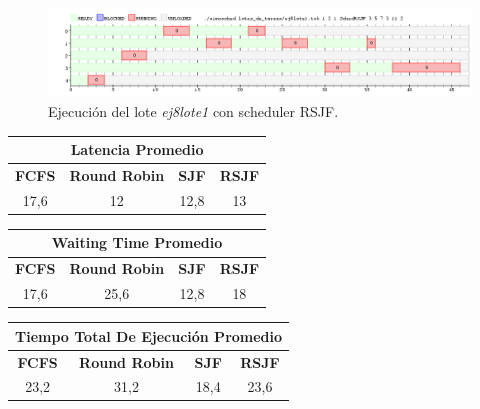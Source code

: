 \begin{figure}[!h]
	\begin{center}
		\includegraphics[width=500px]{imagenes/ej8_prueba1_rsjf.png}
		\caption{Ejecución del lote \emph{ej8lote1} con scheduler RSJF.}
		\label{fig:grafico_ej8_prueba1_rsjf}
	\end{center}
\end{figure}

\begin{center}
	\begin{tabular}{|c|c|c|c|}
		\hline
		\multicolumn{4}{|c|}{\large{\textbf{Latencia Promedio}}} \\
		\hline
		\textbf{FCFS} & \textbf{Round Robin} & \textbf{SJF} & \textbf{RSJF} \\
		\hline
		17,6 & 12 & 12,8 & 13 \\
		\hline
	\end{tabular}
\end{center}

\begin{center}
	\begin{tabular}{|c|c|c|c|}
		\hline
		\multicolumn{4}{|c|}{\large{\textbf{Waiting Time Promedio}}} \\
		\hline
		\textbf{FCFS} & \textbf{Round Robin} & \textbf{SJF} & \textbf{RSJF} \\
		\hline
		17,6 & 25,6 & 12,8 & 18 \\
		\hline
	\end{tabular}
\end{center}

\begin{center}
	\begin{tabular}{|c|c|c|c|}
		\hline
		\multicolumn{4}{|c|}{\large{\textbf{Tiempo Total De Ejecución Promedio}}} \\
		\hline
		\textbf{FCFS} & \textbf{Round Robin} & \textbf{SJF} & \textbf{RSJF} \\
		\hline
		23,2 & 31,2 & 18,4 & 23,6 \\
		\hline
	\end{tabular}
\end{center}

